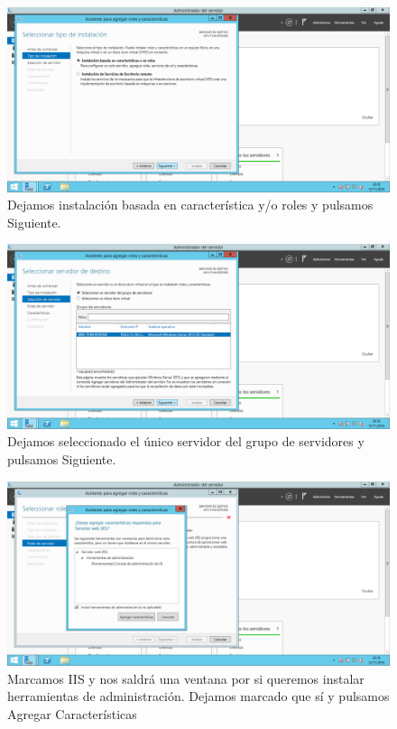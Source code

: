 \begin{flushleft}
\begin{figure}[H]
	\centering
	\includegraphics[scale=0.4]{iis2.png}
	\caption{Dejamos instalación basada en característica y/o roles y pulsamos Siguiente.}
\end{figure}

\begin{figure}[H]
	\centering
	\includegraphics[scale=0.4]{iis3.png}
	\caption{Dejamos seleccionado el único servidor del grupo de servidores y pulsamos Siguiente.}
\end{figure}

\begin{figure}[H]
	\centering
	\includegraphics[scale=0.4]{iis4.png}
	\caption{Marcamos IIS y nos saldrá una ventana por si queremos instalar herramientas de administración. Dejamos
	marcado que sí y pulsamos Agregar Características}
\end{figure}


\end{flushleft}
